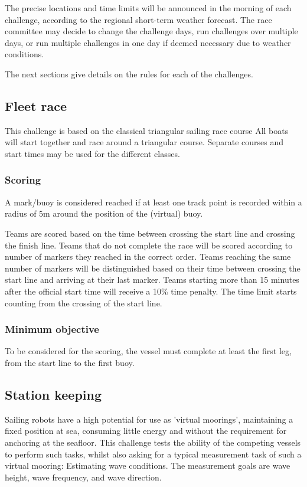 \documentclass[12pt]{article}
\begin{document}
The precise locations and time limits will be announced in the morning of each challenge, 
according to the regional short-term weather forecast.
The race committee may decide to change the challenge days, run challenges over
multiple days, or run multiple challenges in one day if deemed necessary due 
to weather conditions.

The next sections give details on the rules for each of the challenges.

\subsection{Fleet race}

This challenge is based on the classical triangular sailing race course
All boats will start together and race around a triangular course. Separate
courses and start times may be used for the different classes.

\subsubsection{Scoring}
A mark/buoy is considered reached if at least one
track point is recorded within a radius of 5m around the position of the
(virtual) buoy.

Teams are scored based on the time between crossing the start line and crossing
the finish line. Teams that do not complete the race will be scored
according to number of markers they reached in the correct order. Teams reaching
the same number of markers will be distinguished based on their time between
crossing the start line and arriving at their last marker. Teams starting more
than 15 minutes after the official start time will receive a 10\% time penalty.
The time limit starts counting from the crossing of the start line.

\subsubsection{Minimum objective}
To be considered for the scoring, the vessel must complete at least the first
leg, from the start line to the first buoy.

\subsection{Station keeping}
Sailing robots have a high potential for use as 'virtual moorings', maintaining
a fixed position at sea, consuming little energy and without the requirement for
anchoring at the seafloor. This challenge tests the ability of the competing
vessels to perform such tasks, whilst also asking for a typical measurement task
of such a virtual mooring: Estimating wave conditions. The measurement goals are 
wave height, wave frequency, and wave direction.
\end{document}
